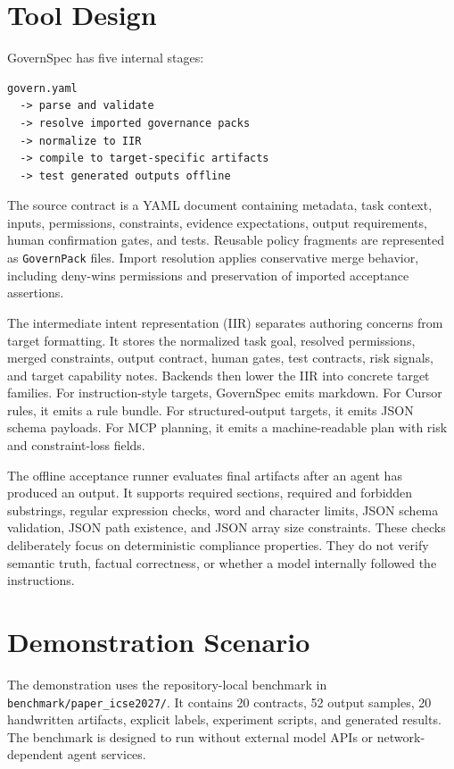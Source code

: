 \documentclass[10pt,conference]{IEEEtran}
\begin{document}
\section{Tool Design}

GovernSpec has five internal stages:
\begin{verbatim}
govern.yaml
  -> parse and validate
  -> resolve imported governance packs
  -> normalize to IIR
  -> compile to target-specific artifacts
  -> test generated outputs offline
\end{verbatim}

The source contract is a YAML document containing metadata, task context, inputs,
permissions, constraints, evidence expectations, output requirements, human
confirmation gates, and tests. Reusable policy fragments are represented as
\texttt{GovernPack} files. Import resolution applies conservative merge behavior,
including deny-wins permissions and preservation of imported acceptance assertions.

The intermediate intent representation (IIR) separates authoring concerns from
target formatting. It stores the normalized task goal, resolved permissions, merged
constraints, output contract, human gates, test contracts, risk signals, and target
capability notes. Backends then lower the IIR into concrete target families. For
instruction-style targets, GovernSpec emits markdown. For Cursor rules, it emits a
rule bundle. For structured-output targets, it emits JSON schema payloads. For MCP
planning, it emits a machine-readable plan with risk and constraint-loss fields.

The offline acceptance runner evaluates final artifacts after an agent has produced
an output. It supports required sections, required and forbidden substrings, regular
expression checks, word and character limits, JSON schema validation, JSON path
existence, and JSON array size constraints. These checks deliberately focus on
deterministic compliance properties. They do not verify semantic truth, factual
correctness, or whether a model internally followed the instructions.

\section{Demonstration Scenario}

The demonstration uses the repository-local benchmark in
\texttt{benchmark/paper\_icse2027/}. It contains 20 contracts, 52 output samples, 20
handwritten artifacts, explicit labels, experiment scripts, and generated results.
The benchmark is designed to run without external model APIs or network-dependent
agent services.
\end{document}
